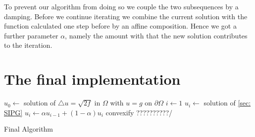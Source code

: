 To prevent our algorithm from doing so we couple the two subsequences by a damping. Before we continue iterating we combine the current solution with the function calculated one step before by an affine composition. Hence we got a further parameter $\alpha$, namely the amount with that the new solution contributes to the iteration.

\section{The final implementation}

\begin{algorithm}
\begin{algorithmic}
\State $u_0\gets $ solution of  $
	\triangle u = \sqrt{2f} \text{ in } \Omega $ with $
	u = g \text{ on }\partial \Omega$
\State $i \gets 1$
	\State $u_i \gets$ solution of \ref{sec: SIPG}
	\State $u_i \gets \alpha u_{i-1} + (1-\alpha)u_i $
	\State convexify ??????????/
\EndWhile
\end{algorithmic}
\caption{Final Algorithm}
\end{algorithm}

